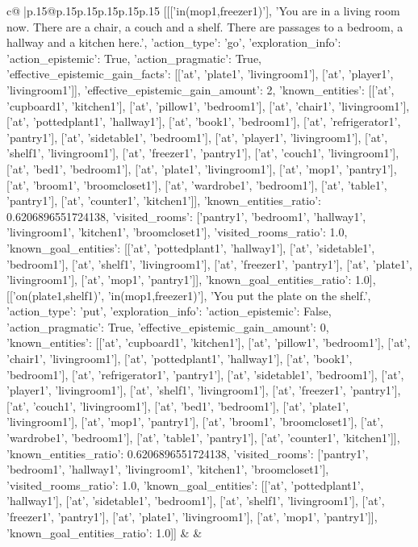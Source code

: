 \documentclass{article}
\begin{document}
{\begin{supertabular}{c@{$\;$}|p{.15\linewidth}@{}p{.15\linewidth}p{.15\linewidth}p{.15\linewidth}p{.15\linewidth}p{.15\linewidth}}
{{{	 [[['in(mop1,freezer1)'], 'You are in a living room now. There are a chair, a couch and a shelf. There are passages to a bedroom, a hallway and a kitchen here.', {'action_type': 'go', 'exploration_info': {'action_epistemic': True, 'action_pragmatic': True, 'effective_epistemic_gain_facts': [['at', 'plate1', 'livingroom1'], ['at', 'player1', 'livingroom1']], 'effective_epistemic_gain_amount': 2, 'known_entities': [['at', 'cupboard1', 'kitchen1'], ['at', 'pillow1', 'bedroom1'], ['at', 'chair1', 'livingroom1'], ['at', 'pottedplant1', 'hallway1'], ['at', 'book1', 'bedroom1'], ['at', 'refrigerator1', 'pantry1'], ['at', 'sidetable1', 'bedroom1'], ['at', 'player1', 'livingroom1'], ['at', 'shelf1', 'livingroom1'], ['at', 'freezer1', 'pantry1'], ['at', 'couch1', 'livingroom1'], ['at', 'bed1', 'bedroom1'], ['at', 'plate1', 'livingroom1'], ['at', 'mop1', 'pantry1'], ['at', 'broom1', 'broomcloset1'], ['at', 'wardrobe1', 'bedroom1'], ['at', 'table1', 'pantry1'], ['at', 'counter1', 'kitchen1']], 'known_entities_ratio': 0.6206896551724138, 'visited_rooms': ['pantry1', 'bedroom1', 'hallway1', 'livingroom1', 'kitchen1', 'broomcloset1'], 'visited_rooms_ratio': 1.0, 'known_goal_entities': [['at', 'pottedplant1', 'hallway1'], ['at', 'sidetable1', 'bedroom1'], ['at', 'shelf1', 'livingroom1'], ['at', 'freezer1', 'pantry1'], ['at', 'plate1', 'livingroom1'], ['at', 'mop1', 'pantry1']], 'known_goal_entities_ratio': 1.0}}], [['on(plate1,shelf1)', 'in(mop1,freezer1)'], 'You put the plate on the shelf.', {'action_type': 'put', 'exploration_info': {'action_epistemic': False, 'action_pragmatic': True, 'effective_epistemic_gain_amount': 0, 'known_entities': [['at', 'cupboard1', 'kitchen1'], ['at', 'pillow1', 'bedroom1'], ['at', 'chair1', 'livingroom1'], ['at', 'pottedplant1', 'hallway1'], ['at', 'book1', 'bedroom1'], ['at', 'refrigerator1', 'pantry1'], ['at', 'sidetable1', 'bedroom1'], ['at', 'player1', 'livingroom1'], ['at', 'shelf1', 'livingroom1'], ['at', 'freezer1', 'pantry1'], ['at', 'couch1', 'livingroom1'], ['at', 'bed1', 'bedroom1'], ['at', 'plate1', 'livingroom1'], ['at', 'mop1', 'pantry1'], ['at', 'broom1', 'broomcloset1'], ['at', 'wardrobe1', 'bedroom1'], ['at', 'table1', 'pantry1'], ['at', 'counter1', 'kitchen1']], 'known_entities_ratio': 0.6206896551724138, 'visited_rooms': ['pantry1', 'bedroom1', 'hallway1', 'livingroom1', 'kitchen1', 'broomcloset1'], 'visited_rooms_ratio': 1.0, 'known_goal_entities': [['at', 'pottedplant1', 'hallway1'], ['at', 'sidetable1', 'bedroom1'], ['at', 'shelf1', 'livingroom1'], ['at', 'freezer1', 'pantry1'], ['at', 'plate1', 'livingroom1'], ['at', 'mop1', 'pantry1']], 'known_goal_entities_ratio': 1.0}}]] 
	  } 
	   } 
	   } 
	 & & \\ 
 


\end{supertabular}}
\end{document}
